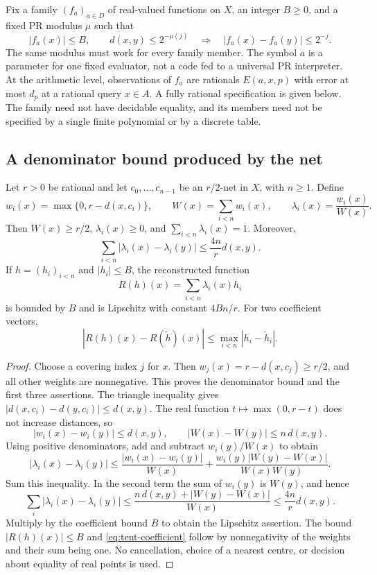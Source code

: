 Fix a family $(f_a)_{a\in D}$ of real-valued functions on $X$, an integer
$B\ge0$, and a fixed PR modulus $\mu$ such that
\begin{equation}\label{eq:top-family}
 |f_a(x)|\le B,\qquad
 d(x,y)\le 2^{-\mu(j)}\quad\Longrightarrow\quad
 |f_a(x)-f_a(y)|\le 2^{-j}.
\end{equation}
The same modulus must work for every family member.  The symbol $a$ is
a parameter for one fixed evaluator, not a code fed to a universal PR
interpreter.  At the arithmetic level, observations of $f_a$ are
rationals $E(a,x,p)$ with error at most $d_p$ at a rational query
$x\in A$.  A fully rational specification is given below.  The family
need not have decidable equality, and its members need not be specified
by a single finite polynomial or by a discrete table.

\subsection{A denominator bound produced by the net}

\begin{lemma}\label{lem:tent-partition}
Let $r>0$ be rational and let $c_0,\ldots,c_{n-1}$ be an $r/2$-net in
$X$, with $n\ge1$.  Define
\[
 w_i(x)=\max\{0,r-d(x,c_i)\},\qquad
 W(x)=\sum_{i<n}w_i(x),\qquad
 \lambda_i(x)=\frac{w_i(x)}{W(x)}.
\]
Then $W(x)\ge r/2$, $\lambda_i(x)\ge0$, and
$\sum_{i<n}\lambda_i(x)=1$.  Moreover,
\begin{equation}\label{eq:tent-lipschitz}
 \sum_{i<n}|\lambda_i(x)-\lambda_i(y)|
 \le\frac{4n}{r}d(x,y).
\end{equation}
If $h=(h_i)_{i<n}$ and $|h_i|\le B$, the reconstructed function
\[
 R(h)(x)=\sum_{i<n}\lambda_i(x)h_i
\]
is bounded by $B$ and is Lipschitz with constant $4Bn/r$.
For two coefficient vectors,
\begin{equation}\label{eq:tent-coefficient}
 |R(h)(x)-R(\widetilde h)(x)|
 \le\max_{i<n}|h_i-\widetilde h_i|.
\end{equation}
\end{lemma}

\begin{proof}
Choose a covering index $j$ for $x$.  Then
$w_j(x)=r-d(x,c_j)\ge r/2$, and all other weights are nonnegative.
This proves the denominator bound and the first three assertions.
The triangle inequality gives
$|d(x,c_i)-d(y,c_i)|\le d(x,y)$.  The real function
$t\mapsto\max(0,r-t)$ does not increase distances, so
\[
 |w_i(x)-w_i(y)|\le d(x,y),\qquad
 |W(x)-W(y)|\le n\,d(x,y).
\]
Using positive denominators, add and subtract $w_i(y)/W(x)$ to obtain
\[
 |\lambda_i(x)-\lambda_i(y)|
 \le\frac{|w_i(x)-w_i(y)|}{W(x)}
  +\frac{w_i(y)|W(y)-W(x)|}{W(x)W(y)}.
\]
Sum this inequality.  In the second term the sum of $w_i(y)$ is
$W(y)$, and hence
\[
 \sum_i|\lambda_i(x)-\lambda_i(y)|
 \le\frac{n\,d(x,y)+|W(y)-W(x)|}{W(x)}
 \le\frac{4n}{r}d(x,y).
\]
Multiply by the coefficient bound $B$ to obtain the Lipschitz assertion.
The bound $|R(h)(x)|\le B$ and \eqref{eq:tent-coefficient} follow by
nonnegativity of the weights and their sum being one.  No cancellation,
choice of a nearest centre, or decision about equality of real points
is used.
\end{proof}

